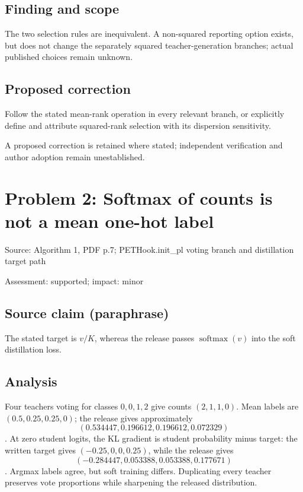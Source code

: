 \documentclass[11pt]{article}
\begin{document}
\subsection*{Finding and scope}

The two selection rules are inequivalent. A non-squared reporting option exists, but does not change the separately squared teacher-generation branches; actual published choices remain unknown.

\subsection*{Proposed correction}

Follow the stated mean-rank operation in every relevant branch, or explicitly define and attribute squared-rank selection with its dispersion sensitivity.

A proposed correction is retained where stated; independent verification and author adoption remain unestablished.

\section*{Problem 2: Softmax of counts is not a mean one-hot label}

Source: Algorithm 1, PDF p.7; PETHook.init\_pl voting branch and distillation target path

Assessment: supported; impact: minor

\subsection*{Source claim (paraphrase)}

The stated target is \(v/K\), whereas the release passes \(\operatorname{softmax}(v)\) into the soft distillation loss.

\subsection*{Analysis}

Four teachers voting for classes \(0,0,1,2\) give counts \((2,1,1,0)\). Mean labels are \((0.5,0.25,0.25,0)\); the release gives approximately \[(0.534447,0.196612,0.196612,0.072329)\]. At zero student logits, the KL gradient is student probability minus target: the written target gives \((-0.25,0,0,0.25)\), while the release gives \[(-0.284447,0.053388,0.053388,0.177671)\]. Argmax labels agree, but soft training differs. Duplicating every teacher preserves vote proportions while sharpening the released distribution.
\end{document}
